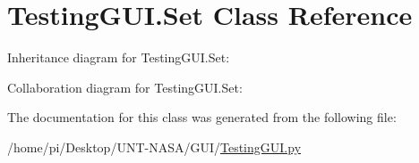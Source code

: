 \hypertarget{classTestingGUI_1_1Set}{}\section{Testing\+G\+U\+I.\+Set Class Reference}
\label{classTestingGUI_1_1Set}


Inheritance diagram for Testing\+G\+U\+I.\+Set\+:


Collaboration diagram for Testing\+G\+U\+I.\+Set\+:


The documentation for this class was generated from the following file\+:\begin{DoxyCompactItemize}
\item 
/home/pi/\+Desktop/\+U\+N\+T-\/\+N\+A\+S\+A/\+G\+U\+I/\hyperlink{GUI_2TestingGUI_8py}{Testing\+G\+U\+I.\+py}\end{DoxyCompactItemize}
